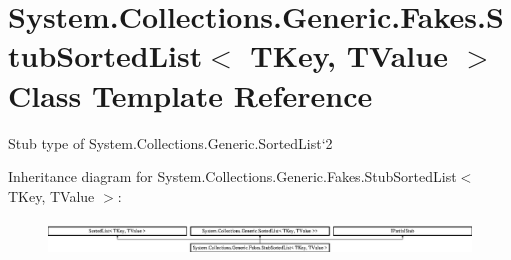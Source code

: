 \hypertarget{class_system_1_1_collections_1_1_generic_1_1_fakes_1_1_stub_sorted_list_3_01_t_key_00_01_t_value_01_4}{\section{System.\-Collections.\-Generic.\-Fakes.\-Stub\-Sorted\-List$<$ T\-Key, T\-Value $>$ Class Template Reference}
\label{class_system_1_1_collections_1_1_generic_1_1_fakes_1_1_stub_sorted_list_3_01_t_key_00_01_t_value_01_4}
}


Stub type of System.\-Collections.\-Generic.\-Sorted\-List`2 


Inheritance diagram for System.\-Collections.\-Generic.\-Fakes.\-Stub\-Sorted\-List$<$ T\-Key, T\-Value $>$\-:\begin{figure}[H]
\begin{center}
\leavevmode
\includegraphics[height=0.933333cm]{class_system_1_1_collections_1_1_generic_1_1_fakes_1_1_stub_sorted_list_3_01_t_key_00_01_t_value_01_4}
\end{center}
\end{figure}
